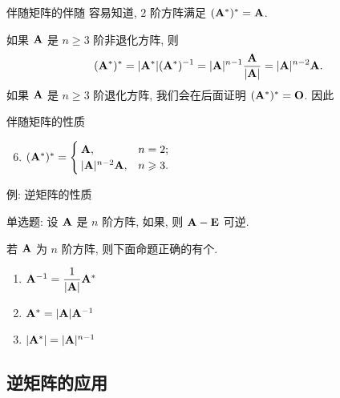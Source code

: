 \begin{frame}{伴随矩阵的伴随}
	\onslide<+->
	容易知道, $2$ 阶方阵满足 $({\mathbf{A}}^*)^*={\mathbf{A}}$.

	\onslide<+->
	如果 ${\mathbf{A}}$ 是 $n\ge3$ 阶非退化方阵, 则
	\[({\mathbf{A}}^*)^*=|{\mathbf{A}}^*|({\mathbf{A}}^*)^{-1}=|{\mathbf{A}}|^{n-1}\dfrac{{\mathbf{A}}}{|{\mathbf{A}}|}=|{\mathbf{A}}|^{n-2}{\mathbf{A}}.\]
	\onslide<+->
	如果 ${\mathbf{A}}$ 是 $n\ge3$ 阶退化方阵, 我们会在后面证明 $({\mathbf{A}}^*)^*={\mathbf{O}}$.
	\onslide<+->
	因此
	\begin{block}{伴随矩阵的性质}
		\begin{enumerate}
			\setcounter{enumi}{5}
			\item $({\mathbf{A}}^*)^*=\begin{cases}
				{\mathbf{A}},&n=2;\\
				|{\mathbf{A}}|^{n-2}{\mathbf{A}},&n\geqslant3.
			\end{cases}$
		\end{enumerate}
	\end{block}
\end{frame}


\begin{frame}{例: 逆矩阵的性质}
	\onslide<+->
	\begin{exercise}
		单选题: 设 ${\mathbf{A}}$ 是 $n$ 阶方阵, 如果, 则 ${\mathbf{A}}-{\mathbf{E}}$ 可逆.
	\end{exercise}
	\onslide<+->
	\begin{exercise}
		若 ${\mathbf{A}}$ 为 $n$ 阶方阵, 则下面命题正确的有\fillblank{\visible<+->{\alert{1}}}个.
		\begin{enumerate}
			\item ${\mathbf{A}}^{-1}=\dfrac1{|{\mathbf{A}}|}{\mathbf{A}}^*$
			\item ${\mathbf{A}}^*=|{\mathbf{A}}|{\mathbf{A}}^{-1}$
			\item $|{\mathbf{A}}^*|=|{\mathbf{A}}|^{n-1}$
		\end{enumerate}
	\end{exercise}
\end{frame}


\subsection{逆矩阵的应用}

